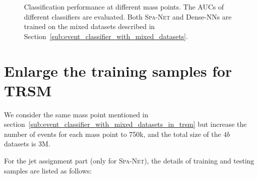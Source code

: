 \documentclass[12pt]{article}
\begin{document}
        \begin{figure}[htpb]
            \centering
            \caption{Classification performance at different mass points. The AUCs of different classifiers are evaluated. Both \textsc{Spa-Net} and Dense-NNs are trained on the mixed datasets described in Section~\ref{sub:event_classifier_with_mixed_datasets}.}  
            \label{fig:classification_performance_each_mass_point-TRSM}  
        \end{figure}
\section{Enlarge the training samples for TRSM}%
\label{sec:enlarge_the_training_samples_for_trsm}
    We consider the same mass point mentioned in section~\ref{sub:event_classifier_with_mixed_datasets_in_trsm} but increase the number of events for each mass point to 750k, and the total size of the $4b$ datasets is 3M.

    For the jet assignment part (only for \textsc{Spa-Net}), the details of training and testing samples are listed as follows:
\end{document}
